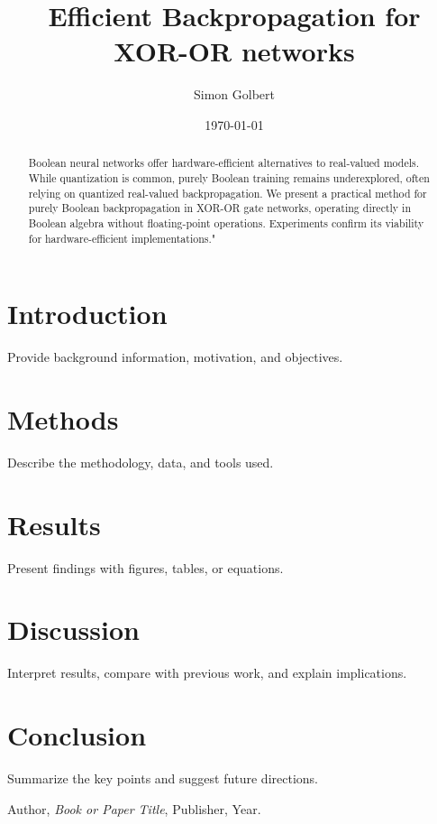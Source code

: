 \documentclass{article}
\title{Efficient Backpropagation for XOR-OR networks}
\author{Simon Golbert}
\date{\today}
\begin{document}
\maketitle

\begin{abstract}
    Boolean neural networks offer hardware-efficient alternatives to real-valued models. While quantization is common, purely Boolean training remains underexplored, often relying on quantized real-valued backpropagation. We present a practical method for purely Boolean backpropagation in XOR-OR gate networks, operating directly in Boolean algebra without floating-point operations. Experiments confirm its viability for hardware-efficient implementations."
\end{abstract}

\section{Introduction}
Provide background information, motivation, and objectives.

\section{Methods}
Describe the methodology, data, and tools used.

\section{Results}
Present findings with figures, tables, or equations.

\section{Discussion}
Interpret results, compare with previous work, and explain implications.

\section{Conclusion}
Summarize the key points and suggest future directions.

\begin{thebibliography}{9}
Author, \textit{Book or Paper Title}, Publisher, Year.
\end{thebibliography}
\end{document}
